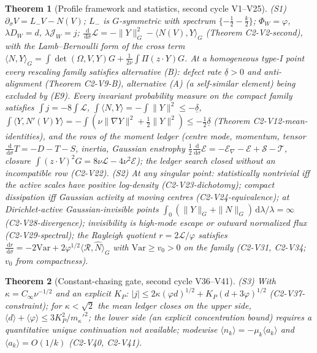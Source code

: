 \documentclass[11pt]{article}
\newcommand{\dd}{\,\mathrm d}
\theoremstyle{plain}
\newtheorem{theorem}{Theorem}[section]
\theoremstyle{definition}
\theoremstyle{remark}
\begin{document}
\begin{theorem}[Profile framework and statistics, second cycle V1--V25]
\label{thm:c4v1-profile}
(S1) \(\partial_\sigma V=L_-V-N(V)\); \(L_-\) is \(G\)-symmetric with spectrum
\(\{-\frac12-\frac k2\}\); \(\Phi_W=\varphi\), \(\lambda D_W=d\), \(\lambda\mathcal J_W=j\);
\(\frac{\dd}{\dd\sigma}\mathcal L=-\|Y\|_G^2-\langle N(V),Y\rangle_G\) (Theorem
C2-V2-second), with the Lamb--Bernoulli form of the cross term
\(\langle N,Y\rangle_G=\int\det(\Omega,V,Y)G+\frac1{2\nu}\int\Pi(z\cdot Y)G\).  At a
homogeneous type-I point every rescaling family satisfies alternative
(B): defect rate \(\underline\delta>0\) and anti-alignment (Theorem
C2-V9-B), alternative (A) (a self-similar element) being excluded by
(E9).  Every invariant probability measure on the compact family
satisfies \(\int j=-8\int\mathcal L\), \(\int\langle N,Y\rangle=-\int\|Y\|^2\le-\underline\delta\),
\(\int\langle Y,N'(V)Y\rangle=-\int(\nu\|\nabla Y\|^2+\frac12\|Y\|^2)\le-\frac12\underline\delta\)
(Theorem C2-V12-mean-identities), and the rows of the moment ledger (centre
mode, momentum, tensor \(\frac{\dd}{\dd\sigma}T=-D-T-S\), inertia, Gaussian
enstrophy \(\frac12\frac{\dd}{\dd\sigma}\mathcal E=-\mathcal E_\nabla-\mathcal E+\mathcal S-\mathcal T\),
closure \(\int(z\cdot V)^2G=8\nu\mathcal L-4\nu^2\mathcal E\)); the ledger search
closed without an incompatible row (C2-V22).  (S2) At any singular
point: statistically nontrivial iff the active scales have positive
log-density (C2-V23-dichotomy); compact dissipation iff Gaussian
activity at moving centres (C2-V24-equivalence); at Dirichlet-active
Gaussian-invisible points \(\int_0(\|Y\|_G+\|N\|_G)\dd\lambda/\lambda=\infty\)
(C2-V28-divergence); invisibility is high-mode escape or outward
normalized flux (C2-V29-spectral); the Rayleigh quotient
\(r=2\mathcal L/\varphi\) satisfies \(\frac{\dd r}{\dd\sigma}=-2\mathrm{Var}+2\varphi^{1/2}\langle\mathcal R,\widehat N\rangle_G\)
with \(\mathrm{Var}\ge v_0>0\) on the family (C2-V31, C2-V34; \(v_0\) from
compactness).
\end{theorem}

\begin{theorem}[Constant-chasing gate, second cycle V36--V41]
\label{thm:c4v1-constants}
(S3) With \(\kappa=C_\infty\nu^{-1/2}\) and an explicit \(K_P\):
\(|j|\le2\kappa(\varphi d)^{1/2}+K_P(d+3\varphi)^{1/2}\) (C2-V37-constraint); for
\(\kappa<\sqrt2\) the mean ledger closes on the upper side,
\(\langle d\rangle+\langle\varphi\rangle\le3K_P^2/m_\kappa'^2\); the lower side (an
explicit concentration bound) requires a quantitative unique
continuation not available; modewise
\(\langle n_k\rangle=-\mu_k\langle a_k\rangle\) and \(\langle a_k\rangle=O(1/k)\) (C2-V40, C2-V41).
\end{theorem}
\end{document}

